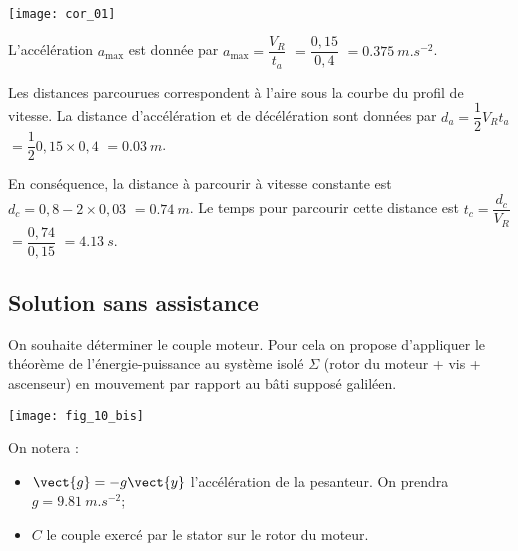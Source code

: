 \begin{multicols}{2}
\ifprof
\begin{corrige}~\\

\begin{center}
\texttt{[image: cor\_01]}
\end{center}

L’accélération $a_{\text{max}}$ est donnée par $a_{\text{max}} = \dfrac{V_R}{t_a}$ $=\dfrac{0,15}{0,4}$ $=\SI{0,375}{m.s^{-2}}$. 

Les distances parcourues correspondent à l'aire sous la courbe du profil de vitesse. La distance d'accélération et de décélération sont données par $d_a=\dfrac{1}{2}V_R t_a$ $=\dfrac{1}{2}0,15\times 0,4$ $=\SI{0,03}{m}$.

En conséquence, la distance à parcourir à vitesse constante est $d_c=0,8-2\times 0,03$ $=\SI{0,74}{m}$. Le temps pour parcourir cette distance est $t_c=\dfrac{d_c}{V_R}$ $=\dfrac{0,74}{0,15}$ $=\SI{4,13}{s}$.
\end{corrige}
\else
\fi

\subsection*{Solution sans assistance}
\ifprof
\else
On souhaite déterminer le couple moteur. Pour cela on propose d’appliquer le théorème de
l’énergie-puissance au système isolé $\Sigma$ (rotor du moteur + vis + ascenseur) en mouvement
par rapport au bâti supposé galiléen. 

\begin{center}
\texttt{[image: fig\_10\_bis]}
\end{center}

On notera :
\begin{itemize}
\item $\vect{g}=-g\vect{y}$ l’accélération de la pesanteur. On prendra $g=\SI{9,81}{m.s^{-2}}$;
\item $C$ le couple exercé par le stator sur le rotor du moteur.
\end{itemize}
\fi


\end{multicols}

